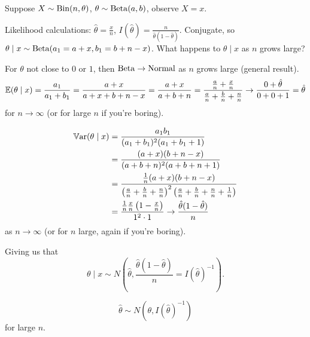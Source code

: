 \documentclass[10pt, a4paper]{article}
\begin{document}
\begin{example}
    Suppose $X \sim \operatorname{Bin}(n, \theta)$,
    $\theta \sim \operatorname{Beta}(a, b)$,
    observe $X = x$.

    Likelihood calculations:
    $\hat{\theta} = \frac{x}{n}$,
    $I(\hat{\theta}) = \frac{n}{\hat{\theta}(1 - \hat{\theta})}$.
    Conjugate,
    so $\theta \mid x \sim \operatorname{Beta}(a_1 = a + x, b_1 = b + n - x)$.
    What happens to $\theta \mid x$ as $n$ grows large?

    For $\theta$ not close to $0$ or $1$,
    then $\operatorname{Beta} \to \text{Normal}$ as $n$ grows large
    (general result).
    \[
    \mathbb{E}(\theta \mid x) = \frac{a_1}{a_1 + b_1} = \frac{a + x}{a + x + b + n - x} = \frac{a + x}{a + b + n} = \frac{\frac{a}{n} + \frac{x}{n}}{\frac{a}{n} + \frac{b}{n} + \frac{n}{n}} \to \frac{0 + \hat{\theta}}{0 + 0 + 1} = \hat{\theta}
    \]
    for $n \to \infty$
    (or for large $n$ if you're boring).

    \begin{align*}
        \mathbb{V}\mathrm{ar}(\theta \mid x) &= \frac{a_1b_1}{(a_1 + b_1) ^ 2(a_1 + b_1 + 1)} \\
        &= \frac{(a + x)(b + n - x)}{(a + b + n) ^ 2(a + b + n + 1)} \\
        &= \frac{\frac{1}{n}(a + x)(b + n - x)}{\left(\frac{a}{n} + \frac{b}{n} + \frac{n}{n}\right) ^ 2\left(\frac{a}{n} + \frac{b}{n} + \frac{n}{n} + \frac{1}{n}\right)} \\
        &= \frac{\frac{1}{n}\frac{x}{n}\left(1 - \frac{x}{n}\right)}{1 ^ 2 \cdot 1} \to \frac{\hat{\theta}(1 - \hat{\theta})}{n}
    \end{align*}
    as $n \to \infty$
    (or for $n$ large,
    again if you're boring).

    Giving us that
    \[
    \theta \mid x \sim N\left(\hat{\theta}, \frac{\hat{\theta}(1 - \hat{\theta})}{n} = I(\hat{\theta}) ^ {-1}\right).
    \]
\end{example}

\[
\hat{\theta} \sim N(\theta, I(\hat{\theta}) ^ {-1})
\]
for large $n$.
\end{document}
